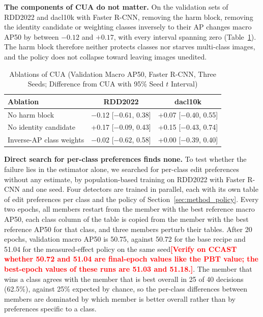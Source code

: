\documentclass[conference]{IEEEtran}
\newcommand{\todo}[1]{\textcolor{red}{\textbf{[#1]}}}
\begin{document}
\noindent\textbf{The components of CUA do not matter.} On the validation sets of RDD2022 and dacl10k with Faster R-CNN, removing the harm block, removing the identity candidate or weighting classes inversely to their AP changes macro AP50 by between $-0.12$ and $+0.17$, with every interval spanning zero (Table~\ref{tab:ablations}). The harm block therefore neither protects classes nor starves multi-class images, and the policy does not collapse toward leaving images unedited.

\begin{table}[t]
\caption{Ablations of CUA (Validation Macro AP50, Faster R-CNN, Three Seeds; Difference from CUA with 95\% Seed $t$ Interval)}
\label{tab:ablations}
\centering
\footnotesize
\setlength{\tabcolsep}{3pt}
\begin{tabular}{@{}lcc@{}}
\toprule
\textbf{Ablation} & \textbf{RDD2022} & \textbf{dacl10k} \\
\midrule
No harm block & $-0.12$ [$-0.61$, 0.38] & +0.07 [$-0.40$, 0.55] \\
No identity candidate & +0.17 [$-0.09$, 0.43] & +0.15 [$-0.43$, 0.74] \\
Inverse-AP class weights & $-0.02$ [$-0.62$, 0.58] & +0.00 [$-0.39$, 0.40] \\
\bottomrule
\end{tabular}
\end{table}

\noindent\textbf{Direct search for per-class preferences finds none.} To test whether the failure lies in the estimator alone, we searched for per-class edit preferences without any estimate, by population-based training on RDD2022 with Faster R-CNN and one seed. Four detectors are trained in parallel, each with its own table of edit preferences per class and the policy of Section~\ref{sec:method_policy}. Every two epochs, all members restart from the member with the best reference macro AP50, each class column of the table is copied from the member with the best reference AP50 for that class, and three members perturb their tables. After 20 epochs, validation macro AP50 is 50.75, against 50.72 for the base recipe and 51.04 for the measured-effect policy on the same seed\todo{Verify on CCAST whether 50.72 and 51.04 are final-epoch values like the PBT value; the best-epoch values of these runs are 51.03 and 51.18.}. The member that wins a class agrees with the member that is best overall in 25 of 40 decisions (62.5\%), against 25\% expected by chance, so the per-class differences between members are dominated by which member is better overall rather than by preferences specific to a class.
\end{document}
